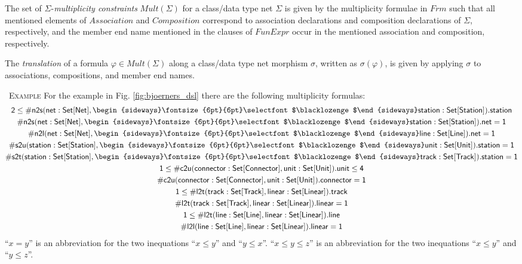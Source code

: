 \documentclass[10pt,fleqn,final]{scrreprt}
\newcommand{\cbs}[0]{\color{red}\xspace} %
\newcommand{\cbe}[0]{\color{black}\xspace} %
\newenvironment{definitions}[0]{\medskip }{}
\newenvironment{example}[0]{\ \newline \textsc{Example}\quad }{}
\newcommand{\composition}{\raisebox{0.2pt}{\begin{sideways}\fontsize{6pt}{6pt}\selectfont$\blacklozenge$\end{sideways}}}
\begin{document}
\begin{definitions}
The set of $\Sigma$-\emph{multiplicity constraints}
$\mathit{Mult}(\Sigma)$ for a class/data type net $\Sigma$ is given by the
multiplicity formulae in $\mathit{Frm}$ such that all mentioned elements
of $\mathit{Association}$ and $\mathit{Composition}$ correspond to
association declarations and composition declarations of $\Sigma$,
respectively, and the member end name mentioned in the clauses of
$\mathit{FunExpr}$ occur in the mentioned association and composition,
respectively.

The \emph{translation} of a formula $\varphi \in \mathit{Mult}(\Sigma)$
along a class/data type net morphism $\sigma$, written as $\sigma(\varphi)$,
is given by applying $\sigma$ to associations, compositions, and member end
names.


\begin{example}
\cbs For the example in Fig. \ref{fig:bjoerners_dsl} there are the following multiplicity formulas:\cbe
\begin{gather*}
  \mathsf{2 \leq \#n2s(net : Set[Net], \composition station : Set[Station]).station}
\\
  \mathsf{\#n2s(net : Set[Net], \composition station : Set[Station]).net = 1}
\\
  \mathsf{\#n2l(net : Set[Net], \composition line : Set[Line]).net = 1}
\\
  \mathsf{\#s2u(station : Set[Station], \composition unit : Set[Unit]).station = 1}
\\
  \mathsf{\#s2t(station : Set[Station], \composition track : Set[Track]).station = 1}
\\
  \mathsf{1 \leq \#c2u(connector : Set[Connector], unit : Set[Unit]).unit \leq 4}
\\
  \mathsf{\#c2u(connector : Set[Connector], unit : Set[Unit]).connector = 1}
\\
  \mathsf{1 \leq \#l2t(track : Set[Track], linear : Set[Linear]).track}
\\
  \mathsf{\#l2t(track : Set[Track], linear : Set[Linear]).linear = 1}
\\
  \mathsf{1 \leq \#l2t(line : Set[Line], linear : Set[Linear]).line}
\\
  \mathsf{\#l2l(line : Set[Line], linear : Set[Linear]).linear = 1}
\end{gather*}
%
\cbs ``$x = y$'' is an  
abbreviation for the two inequations ``$x\leq y$'' and ``$y\leq x$''.
``$x \leq y \leq z$'' is an abbreviation for the two  inequations 
``$x\leq y$'' and ``$y\leq z$''.
\cbe
\end{example}



\end{definitions}
\end{document}
